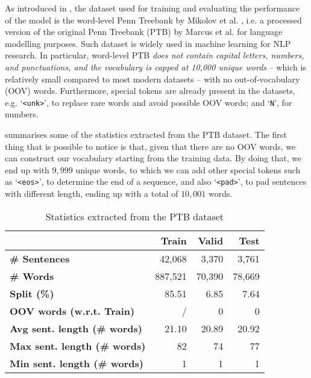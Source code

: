 As introduced in , the dataset used for training and evaluating the performance of the model is the word-level Penn Treebank by Mikolov et al. \cite{mikolovRecurrentNeuralNetwork2010a}, i.e. a processed version of the original Penn Treebank (PTB) by Marcus et al. \cite{marcusBuildingLargeAnnotated1993} for language modelling purposes. Such dataset is widely used in machine learning for NLP research. In particular, word-level PTB \textit{does not contain capital letters, numbers, and punctuations, and the vocabulary is capped at 10,000 unique words} -- which is relatively small compared to most modern datasets -- with no out-of-vocabulary (OOV) words. Furthermore, special tokens are already present in the datasets, e.g. `\texttt{<unk>}', to replace rare words and avoid possible OOV words; and `\texttt{N}', for numbers.

 summarises some of the statistics extracted from the PTB dataset. The first thing that is possible to notice is that, given that there are no OOV words, we can construct our vocabulary starting from the training data. By doing that, we end up with $9,999$ unique words, to which we can add other special tokens such as `\texttt{<eos>}', to determine the end of a sequence, and also `\texttt{<pad>}', to pad sentences with different length, ending up with a total of $10,001$ words.

\begin{table}[!t]
    \centering
    \caption{Statistics extracted from the PTB dataset}
    \label{tab:ptb_stats}
    \begin{tabular}{l r r r}
        \toprule %
        \textbf{} & \textbf{Train} & \textbf{Valid} & \textbf{Test} \\
        \midrule %
        \textbf{\# Sentences} & 42,068 & 3,370 & 3,761 \\
        \textbf{\# Words} & 887,521 & 70,390 & 78,669 \\
        \textbf{Split (\%)} & 85.51 & 6.85 & 7.64 \\
        \textbf{OOV words (w.r.t. Train)} & / & 0 & 0 \\
        \textbf{Avg sent. length (\# words)} & 21.10 & 20.89 & 20.92 \\
        \textbf{Max sent. length (\# words)} & 82 & 74 & 77 \\
        \textbf{Min sent. length (\# words)} & 1 & 1 & 1 \\
        \bottomrule %
    \end{tabular}
\end{table}

